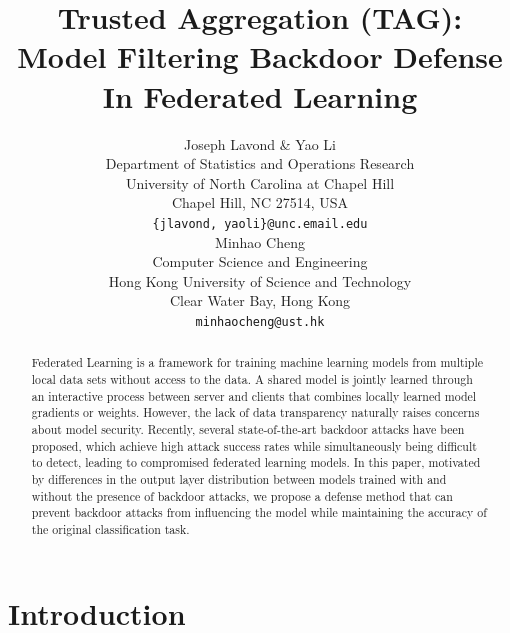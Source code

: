 \documentclass{article} %
\title{
    Trusted Aggregation (TAG): Model Filtering Backdoor Defense In Federated Learning
}
\author{%
    Joseph Lavond \& Yao Li  \\
    Department of Statistics and Operations Research \\
    University of North Carolina at Chapel Hill \\
    Chapel Hill, NC 27514, USA \\
    \texttt{\{jlavond, yaoli\}@unc.email.edu} \\
    \And
    Minhao Cheng \\
    Computer Science and Engineering \\
    Hong Kong University of Science and Technology \\
    Clear Water Bay, Hong Kong \\
    \texttt{minhaocheng@ust.hk}
}
\newcommand{\yli}[1]{{\color{cyan}#1}}
\begin{document}
\maketitle

\vspace{-1cm}
\begin{abstract}
    
    Federated Learning is a framework for training machine learning models from multiple local data sets without access to the data. A shared model is jointly learned through an interactive process between server and clients that combines locally learned model gradients or weights. However, the lack of data transparency naturally raises concerns about model security. Recently, several state-of-the-art backdoor attacks have been proposed, which achieve high attack success rates while simultaneously being difficult to detect, leading to compromised federated learning models. In this paper, motivated by differences in the output layer distribution between models trained with and without the presence of backdoor attacks, we propose a defense method that can prevent backdoor attacks from influencing the model while maintaining the accuracy of the original classification task.
\end{abstract}


\vspace{-0.5cm}
\section{Introduction}
\end{document}
